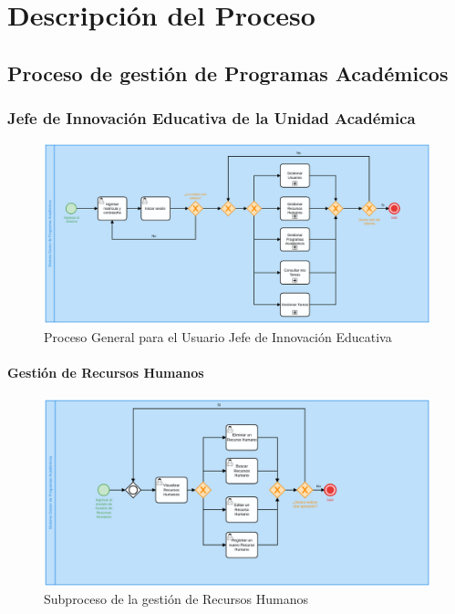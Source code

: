 \chapter{Descripción del Proceso}
    \section{Proceso de gestión de Programas Académicos}
        \subsection{Jefe de Innovación Educativa de la Unidad Académica}
        \begin{figure}[!hbtp]
        	\centering
        	\hypertarget{BPMNG}{\includegraphics[width=\linewidth]{images/SP1/ProcesoGeneral}
        	\caption{Proceso General para el Usuario Jefe de Innovación Educativa}}
        	\label{BPMNG}
        \end{figure}
        \newpage
    	\subsubsection{Gestión de Recursos Humanos}

        \begin{figure}[!hbtp]
        	\centering
        	\hypertarget{BPMNGRH}{\includegraphics[width=\linewidth]{images/SP1/gestionRH.png}}
        	\caption{Subproceso de la gestión de Recursos Humanos}
        	\label{BPMNGRH}
        \end{figure}

